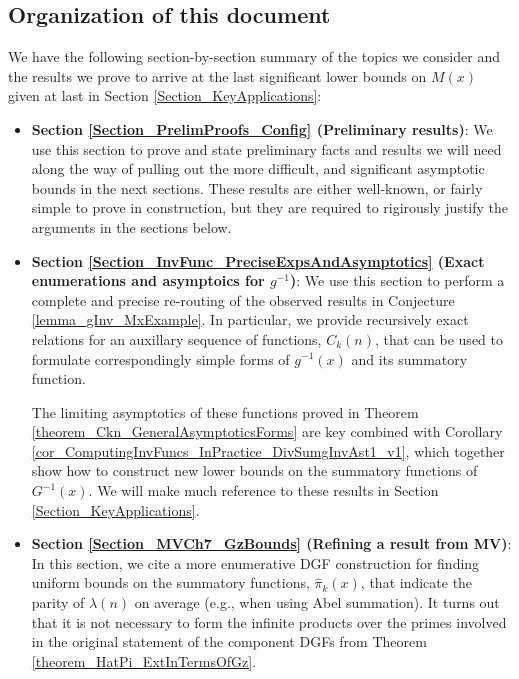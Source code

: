 \documentclass[11pt,reqno,a4letter]{article}
\numberwithin{figure}{section}
\numberwithin{table}{section}
\theoremstyle{plain}
\numberwithin{theorem}{section}
\theoremstyle{definition}
\begin{document}
\subsection{Organization of this document} 

We have the following section-by-section summary of the topics we consider and the 
results we prove to arrive at the last significant lower bounds on 
$M(x)$ given at last in Section \ref{Section_KeyApplications}: 
\begin{itemize} 
     \item \textbf{Section \ref{Section_PrelimProofs_Config} (Preliminary results)}: 
           We use this section to prove and state preliminary facts and results we will need along the 
           way of pulling out the more difficult, and significant asymptotic bounds in the next sections. 
           These results are either well-known, or fairly simple to prove in construction, but they are 
           required to rigirously justify the arguments in the sections below. 
     \item \textbf{Section \ref{Section_InvFunc_PreciseExpsAndAsymptotics} 
           (Exact enumerations and asymptoics for $g^{-1}$)}: 
           We use this section to perform a complete and precise re-routing of the observed results in 
           Conjecture \ref{lemma_gInv_MxExample}. 
           In particular, we provide recursively exact relations for an auxillary 
           sequence of functions, $C_k(n)$, that can be used to formulate correspondingly simple forms 
           of $g^{-1}(x)$ and its summatory function. 
           
           The limiting asymptotics of these functions 
           proved in Theorem \ref{theorem_Ckn_GeneralAsymptoticsForms} are key combined with 
           Corollary \ref{cor_ComputingInvFuncs_InPractice_DivSumgInvAst1_v1}, 
           which together show how to construct new lower bounds on the 
           summatory functions of $G^{-1}(x)$. We will make much reference to these results in 
           Section \ref{Section_KeyApplications}. 
     \item \textbf{Section \ref{Section_MVCh7_GzBounds} (Refining a result from MV)}: 
           In this section, we cite a more enumerative DGF construction for finding uniform bounds 
           on the summatory functions, $\widehat{\pi}_k(x)$, that indicate the parity of $\lambda(n)$ 
           on average (e.g., when using Abel summation). 
           It turns out that it is not necessary to form the infinite products over the primes 
           involved in the original statement of the component DGFs from 
           Theorem \ref{theorem_HatPi_ExtInTermsOfGz}. 
           

\end{itemize}
\end{document}
